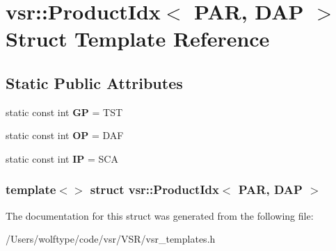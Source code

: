 \hypertarget{structvsr_1_1_product_idx_3_01_p_a_r_00_01_d_a_p_01_4}{\section{vsr\-:\-:Product\-Idx$<$ P\-A\-R, D\-A\-P $>$ Struct Template Reference}
\label{structvsr_1_1_product_idx_3_01_p_a_r_00_01_d_a_p_01_4}
}
\subsection*{Static Public Attributes}
\begin{DoxyCompactItemize}
\item 
\hypertarget{structvsr_1_1_product_idx_3_01_p_a_r_00_01_d_a_p_01_4_ac0952c00f5eed7a54b4da22471d1b4dd}{static const int {\bfseries G\-P} = T\-S\-T}\label{structvsr_1_1_product_idx_3_01_p_a_r_00_01_d_a_p_01_4_ac0952c00f5eed7a54b4da22471d1b4dd}

\item 
\hypertarget{structvsr_1_1_product_idx_3_01_p_a_r_00_01_d_a_p_01_4_a27a8f8d827ede2c855aebf99f2dad32f}{static const int {\bfseries O\-P} = D\-A\-F}\label{structvsr_1_1_product_idx_3_01_p_a_r_00_01_d_a_p_01_4_a27a8f8d827ede2c855aebf99f2dad32f}

\item 
\hypertarget{structvsr_1_1_product_idx_3_01_p_a_r_00_01_d_a_p_01_4_a37c5643a0e929ddd118b68d371d1b18a}{static const int {\bfseries I\-P} = S\-C\-A}\label{structvsr_1_1_product_idx_3_01_p_a_r_00_01_d_a_p_01_4_a37c5643a0e929ddd118b68d371d1b18a}

\end{DoxyCompactItemize}
\subsubsection*{template$<$$>$ struct vsr\-::\-Product\-Idx$<$ P\-A\-R, D\-A\-P $>$}



The documentation for this struct was generated from the following file\-:\begin{DoxyCompactItemize}
\item 
/\-Users/wolftype/code/vsr/\-V\-S\-R/vsr\-\_\-templates.\-h\end{DoxyCompactItemize}
